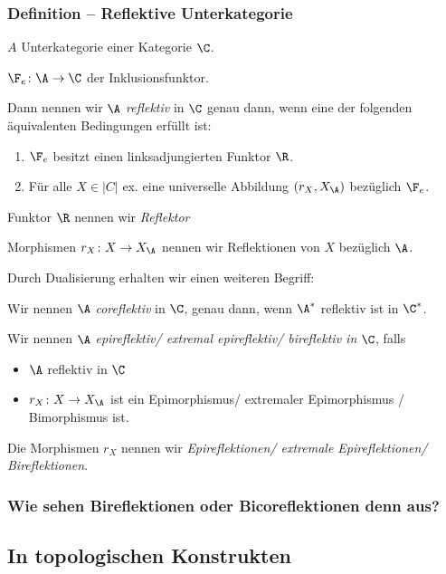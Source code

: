 \documentclass[serif,9pt]{beamer}
\begin{document}
\begin{frame}
  \frametitle{Definition -- Reflektive Unterkategorie}
  $A$ Unterkategorie einer Kategorie $\C$.
  
  $\F_e \colon \A \to \C$ der Inklusionsfunktor.

  Dann nennen wir $\A$ \emph{reflektiv} in $\C$ genau dann, wenn eine der folgenden äquivalenten Bedingungen erfüllt ist:
  \begin{enumerate}[(1)]
    \item $\F_e$ besitzt einen linksadjungierten Funktor $\R$.
    \item Für alle $X \in |C|$ ex. eine universelle Abbildung $(r_X, X_\A)$ bezüglich $\F_e$.
  \end{enumerate}

  \pause
  \vspace{1em}
  Funktor $\R$ nennen wir \emph{Reflektor}
  
  Morphismen $r_X \colon X \to X_\A$ nennen wir Reflektionen von $X$ bezüglich $\A$.

  \pause
  \vspace{1em}
  Durch Dualisierung erhalten wir einen weiteren Begriff:

  Wir nennen $\A$ \emph{coreflektiv} in $\C$, genau dann, wenn $\A^*$ reflektiv ist in $\C^*$. 

  \pause
  \vspace{1em}

  Wir nennen $\A$ \emph{epireflektiv/ extremal epireflektiv/ bireflektiv in} $\C$, falls 
  \pause
  \begin{itemize}
    \item  $\A$ reflektiv in $\C$
    \item  $r_X \colon X \to X_\A$ ist ein Epimorphismus/ extremaler Epimorphismus / Bimorphismus ist.
  \end{itemize}
   
  Die Morphismen $r_X$ nennen wir \emph{Epireflektionen/ extremale Epireflektionen/ Bireflektionen}.
\end{frame}

\begin{frame}
\frametitle{Wie sehen Bireflektionen oder Bicoreflektionen denn aus?}
\end{frame}

\subsection{In topologischen Konstrukten}
\end{document}
